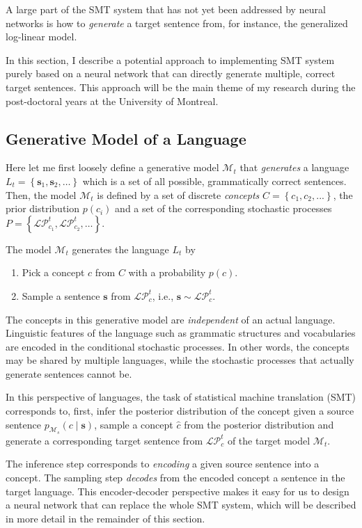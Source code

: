 \documentclass[11pt, oneside]{essay}
\newcommand{\vect}[1]{\mathbf{#1}}
\newcommand{\vs}[0]{\vect{s}}
\begin{document}
A large part of the SMT system that has not yet been addressed by
neural networks is how to \textit{generate} a target sentence
from, for instance, the generalized log-linear model. 

In this section, I describe a potential approach to implementing
SMT system purely based on a neural network that can directly
generate multiple, correct target sentences. This approach will
be the main theme of my research during the post-doctoral years
at the University of Montreal.

\subsection{Generative Model of a Language}

Here let me first loosely define a generative model
$\mathcal{M}_t$ that \textit{generates} a language $L_t=\left\{
\vs_1, \vs_2, \dots \right\}$ which is a set of all possible,
grammatically correct sentences. Then, the model $\mathcal{M}_t$
is defined by a set of
discrete \textit{concepts} $C = \left\{ c_1, c_2, ... \right\}$,
the prior distribution $p(c_i)$ and 
a set of the corresponding stochastic processes $P=\left\{
\mathcal{LP}^t_{c_1}, \mathcal{LP}^t_{c_2}, \dots \right\}$.

The model $\mathcal{M}_t$ generates the language $L_t$ by
\begin{enumerate}
\item Pick a concept $c$ from $C$ with a probability $p(c)$.
\item Sample a sentence $\vs$ from $\mathcal{LP}^t_c$, i.e., $\vs \sim
\mathcal{LP}^t_c$.
\end{enumerate}

The concepts in this generative model are \textit{independent} of
an actual language. Linguistic features of the language such as
grammatic structures and vocabularies are encoded in the
conditional stochastic processes. In other words, the concepts
may be shared by multiple languages, while the stochastic
processes that actually generate sentences cannot be.

In this perspective of languages, the task of statistical machine
translation (SMT) corresponds to, first, infer the posterior
distribution of the concept given a source sentence
$p_{\mathcal{M}_s} (c \mid \vs)$, sample a concept $\hat{c}$ from
the posterior distribution and generate a corresponding target
sentence from $\mathcal{LP}^t_{c}$ of the target model
$\mathcal{M}_t$. 

The inference step corresponds to \textit{encoding} a given
source sentence into a concept. The sampling step
\textit{decodes} from the encoded concept a sentence in the
target language. This encoder-decoder perspective makes it easy
for us to design a neural network that can replace the whole
SMT system, which will be described in more detail in the
remainder of this section.
\end{document}
